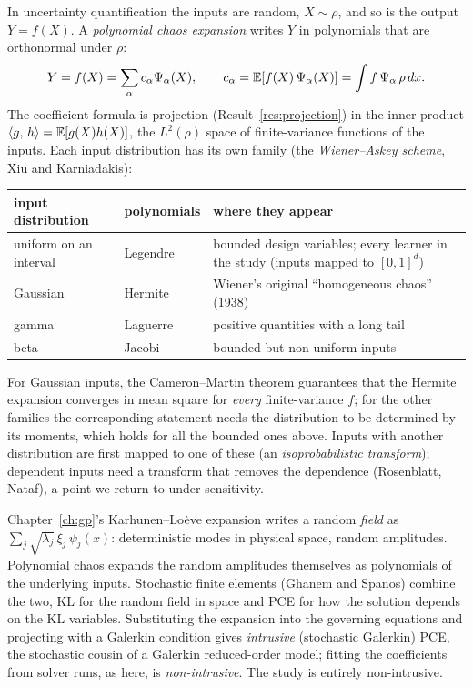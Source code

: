 In uncertainty quantification the inputs are random, $X \sim \rho$, and so is the output $Y = f(X)$. A
\emph{polynomial chaos expansion} writes $Y$ in polynomials that are orthonormal under $\rho$:
\begin{equation}
  Y = f(X) = \sum_{\alpha} c_\alpha \Psi_\alpha(X), \qquad c_\alpha = \mathbb{E}[f(X)\,\Psi_\alpha(X)] = \int f\,\Psi_\alpha\,
  \rho\,dx .
  \label{eq:pce}
\end{equation}
The coefficient formula is projection (Result~\ref{res:projection}) in the inner product $\langle g,\, h\rangle = \mathbb{E}[g(X)h(X)]$,
the $L^2(\rho)$ space of finite-variance functions of the inputs. Each input distribution has its own family
(the \emph{Wiener--Askey scheme}, Xiu and Karniadakis):
\begin{center}
\small
\begin{tabular}{p{3.4cm}p{2.0cm}p{8.2cm}}
\toprule
input distribution & polynomials & where they appear \\
\midrule
uniform on an interval & Legendre & bounded design variables; every learner in the study (inputs mapped to $[0,1]^d$) \\
Gaussian & Hermite & Wiener's original ``homogeneous chaos'' (1938) \\
gamma & Laguerre & positive quantities with a long tail \\
beta & Jacobi & bounded but non-uniform inputs \\
\bottomrule
\end{tabular}
\end{center}
For Gaussian inputs, the Cameron--Martin theorem guarantees that the Hermite expansion converges in mean square for
\emph{every} finite-variance $f$; for the other families the corresponding statement needs the distribution to be
determined by its moments, which holds for all the bounded ones above. Inputs with another distribution are first
mapped to one of these (an \emph{isoprobabilistic transform}); dependent inputs need a transform that removes the
dependence (Rosenblatt, Nataf), a point we return to under sensitivity.

\begin{connection}
Chapter~\ref{ch:gp}'s Karhunen--Lo\`eve expansion writes a random \emph{field} as $\sum_j \sqrt{\lambda_j}\,\xi_j\,
\psi_j(x)$: deterministic modes in physical space, random amplitudes. Polynomial chaos expands the random amplitudes
themselves as polynomials of the underlying inputs. Stochastic finite elements (Ghanem and Spanos) combine the two,
KL for the random field in space and PCE for how the solution depends on the KL variables. Substituting the
expansion into the governing equations and projecting with a Galerkin condition gives \emph{intrusive} (stochastic
Galerkin) PCE, the stochastic cousin of a Galerkin reduced-order model; fitting the coefficients from solver runs,
as here, is \emph{non-intrusive}. The study is entirely non-intrusive.
\end{connection}

